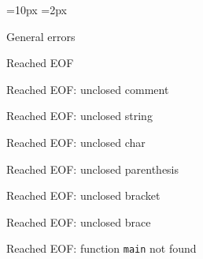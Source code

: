 \documentclass[12pt]{article}
\newcounter{ol}
\newcounter{oll}
\newcounter{olll}
\newcommand{\li}{
    \setcounter{olll}{0}
    \setcounter{oll}{0}
    \addtocounter{ol}{1}
    \item[\theol00.]
}
\newcommand{\lii}{
    \setcounter{olll}{0}
    \addtocounter{oll}{1}
    \item[\theol\theoll0.]
}
\newcommand{\liii}{
    \addtocounter{olll}{1}
    \item[\theol\theoll\theolll.]
}
\begin{document}
\pagecolor{darkgray}
\color{lightgray}\bfseries

\begin{center}
    \fboxsep=10px
    \fboxrule=2px
\end{center}


\begin{description}
    \li General errors
    \begin{description}
        \lii Reached EOF
        \begin{description}
            \liii Reached EOF: unclosed comment
            \liii Reached EOF: unclosed string
            \liii Reached EOF: unclosed char
            \liii Reached EOF: unclosed parenthesis
            \liii Reached EOF: unclosed bracket
            \liii Reached EOF: unclosed brace
            \liii Reached EOF: function \verb|main| not found
        \end{description}
    \end{description}


\end{description}
\end{document}
